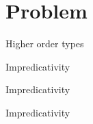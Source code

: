 \documentclass[xcolor=pst,hypertex,compress]{beamer}
\begin{document}
\section{Problem}
\begin{frame}{Higher order types}

\end{frame}
\begin{frame}{Impredicativity}

\end{frame}
\begin{frame}{Impredicativity}

\end{frame}
\begin{frame}{Impredicativity}

\end{frame}
\end{document}
